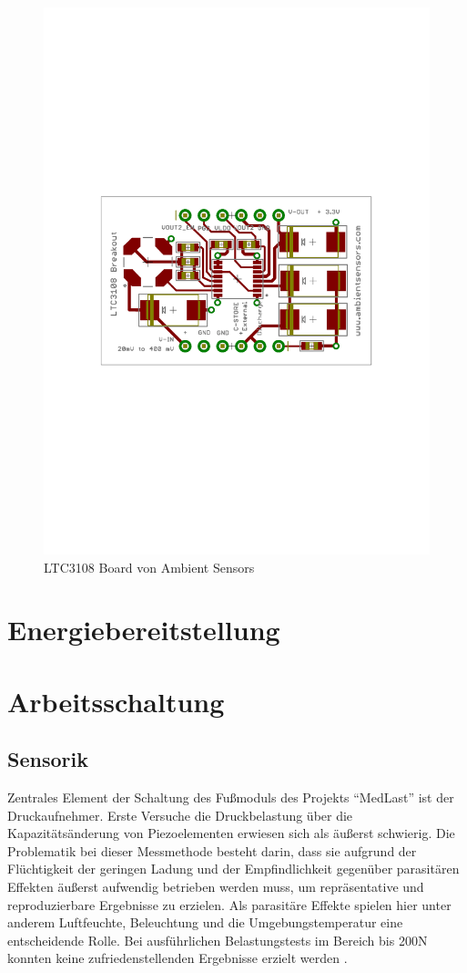 \documentclass[11pt]{scrreprt} %
\begin{document}
\begin{figure}[htb]
\centering
\includegraphics[bb=3.4cm 10.6cm 17.5cm 19.4cm]{Bilder/LTC3108breakoutSSOC}
\caption{LTC3108 Board von Ambient Sensors}
\label{fig:4.1}
\end{figure}
\section{Energiebereitstellung}
\section{Arbeitsschaltung}
\subsection{Sensorik}
Zentrales Element der Schaltung des Fußmoduls des Projekts "`MedLast"' ist der Druckaufnehmer. Erste Versuche die Druckbelastung über die Kapazitätsänderung von Piezoelementen erwiesen sich als äußerst schwierig. Die Problematik bei dieser Messmethode besteht darin, dass sie aufgrund der Flüchtigkeit der geringen Ladung und der Empfindlichkeit gegenüber parasitären Effekten äußerst aufwendig betrieben werden muss, um repräsentative und reproduzierbare Ergebnisse zu erzielen. Als parasitäre Effekte spielen hier unter anderem Luftfeuchte, Beleuchtung und die Umgebungstemperatur eine entscheidende Rolle. Bei ausführlichen Belastungstests im Bereich bis 200N konnten keine zufriedenstellenden Ergebnisse erzielt werden \citep{Jobstmann2012}. 


\end{document}
